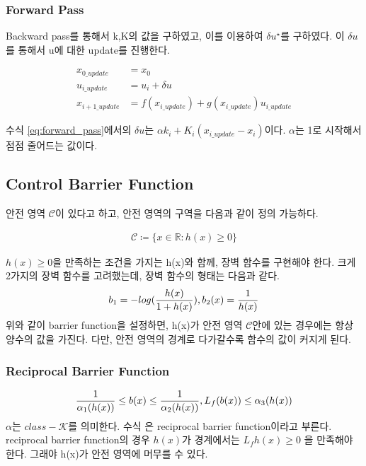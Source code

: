 \documentclass[journal]{IEEEtran}
\begin{document}
\subsubsection{Forward Pass}
Backward pass를 통해서 k,K의 값을 구하였고, 이를 이용하여 $\delta u^{\star}$를 구하였다.
이 $\delta u$를 통해서 u에 대한 update를 진행한다.

\begin{align}
	x_{0\_update}&=x_0\nonumber\\
	u_{i\_update}&=u_i+\delta u\nonumber\\
	x_{i+1\_update}&=f(x_{i\_update})+g(x_{i\_update})u_{i\_update}
	\label{eq:forward_pass}	
\end{align}

수식 \eqref{eq:forward_pass}에서의 $\delta u$는 $\alpha k_i+K_i(x_{i\_update}-x_i)$이다. $\alpha$는 1로 시작해서 점점 줄어드는 값이다.

\subsection{Control Barrier Function}
안전 영역 $\mathcal{C}$이 있다고 하고, 안전 영역의 구역을 다음과 같이 정의 가능하다.

\begin{align}
	\mathcal{C} \coloneqq \{x \in \mathds{R} : h(x) \geq 0 \}
	\label{eq:safe_region}
\end{align}

$h(x) \geq 0$을 만족하는 조건을 가지는 h(x)와 함께, 장벽 함수를 구현해야 한다.
크게 2가지의 장벽 함수를 고려했는데, 장벽 함수의 형태는 다음과 같다.
\begin{align}
	b_1=-log({h(x)\over{1+h(x)}}), b_2(x)={1\over{ h(x)}}
	\label{eq:barrier_function}
\end{align}
위와 같이 barrier function을 설정하면, h(x)가 안전 영역 $\mathcal{C}$안에 있는 경우에는 항상 양수의 값을 가진다. 다만, 안전 영역의 경계로 다가갈수록 함수의 값이 커지게 된다.\\
 \subsubsection{Reciprocal Barrier Function}
 \begin{align}
 	{1 \over \alpha_1(h(x))} \leq b(x) \leq {1\over \alpha_2(h(x))} , L_f(b(x))\leq \alpha_3(h(x))	
	\label{eq:reciprocal_barrier_function} 
\end{align}
$\alpha$는 $class-\mathcal{K}$를 의미한다. 수식 은 reciprocal barrier function이라고 부른다.
reciprocal barrier function의 경우 $h(x)$가 경계에서는 $L_f h(x) \geq0$ 을 만족해야 한다. 그래야 h(x)가 안전 영역에 머무를 수 있다.
\end{document}
